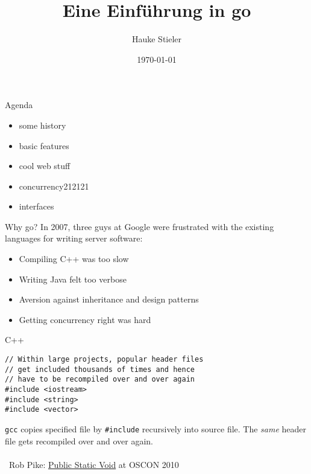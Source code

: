 \documentclass[10pt]{beamer}
\author{Hauke Stieler}
\title{Eine Einführung in go}
\date{\footnotesize \today}
\institute{Fachbereich Informatik der Universität Hamburg}\titlegraphic{\hfill\texttt{[image: images/gopher\\inv]}}
\begin{document}
	\maketitle
	
	
	\begin{frame}{Agenda}
		\begin{itemize}
			\item some history
			\item basic features
			\item cool web stuff
			\item concurrency212121
			\item interfaces
		\end{itemize}
	\end{frame}


	\begin{frame}{Why go?}
		In 2007, three guys at Google were frustrated with the existing languages for writing server software:
		\begin{itemize}
			\item Compiling C++ was too slow
			\item Writing Java felt too verbose
			\item Aversion against inheritance and design patterns
			\item Getting concurrency right was hard
		\end{itemize}
	\end{frame}


	\begin{frame}[fragile]{C++}
		\begin{verbatim}
// Within large projects, popular header files
// get included thousands of times and hence
// have to be recompiled over and over again
#include <iostream>
#include <string>
#include <vector>
		\end{verbatim}
		\vfill
		\pause
		\texttt{gcc} copies specified file by \texttt{#include} recursively into source file. The \textit{same} header file gets recompiled over and over again.\\
		\hfill\\
		\textrightarrow ~Rob Pike: \href{https://www.youtube.com/watch?v=5kj5ApnhPAE}{Public Static Void} at OSCON 2010
		\vfill
\end{frame}
\end{document}
